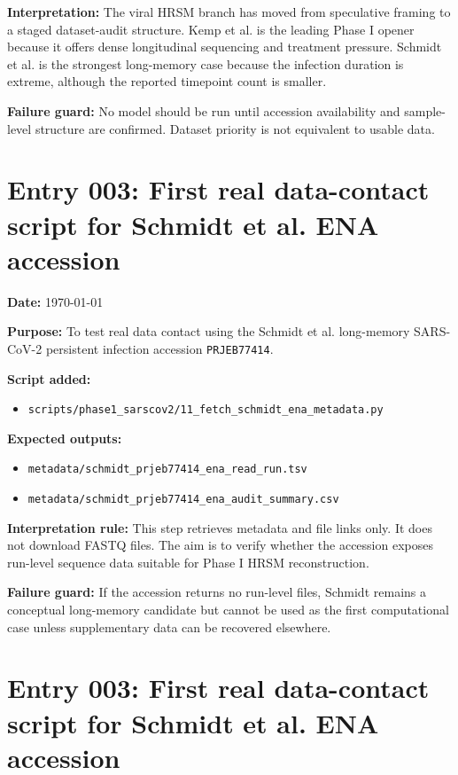 \textbf{Interpretation:} The viral HRSM branch has moved from speculative framing to a staged dataset-audit structure. Kemp et al. is the leading Phase I opener because it offers dense longitudinal sequencing and treatment pressure. Schmidt et al. is the strongest long-memory case because the infection duration is extreme, although the reported timepoint count is smaller.

\textbf{Failure guard:} No model should be run until accession availability and sample-level structure are confirmed. Dataset priority is not equivalent to usable data.


\section*{Entry 003: First real data-contact script for Schmidt et al. ENA accession}

\textbf{Date:} \today

\textbf{Purpose:} To test real data contact using the Schmidt et al. long-memory SARS-CoV-2 persistent infection accession \texttt{PRJEB77414}.

\textbf{Script added:}
\begin{itemize}
    \item \texttt{scripts/phase1\_sarscov2/11\_fetch\_schmidt\_ena\_metadata.py}
\end{itemize}

\textbf{Expected outputs:}
\begin{itemize}
    \item \texttt{metadata/schmidt\_prjeb77414\_ena\_read\_run.tsv}
    \item \texttt{metadata/schmidt\_prjeb77414\_ena\_audit\_summary.csv}
\end{itemize}

\textbf{Interpretation rule:} This step retrieves metadata and file links only. It does not download FASTQ files. The aim is to verify whether the accession exposes run-level sequence data suitable for Phase I HRSM reconstruction.

\textbf{Failure guard:} If the accession returns no run-level files, Schmidt remains a conceptual long-memory candidate but cannot be used as the first computational case unless supplementary data can be recovered elsewhere.


\section*{Entry 003: First real data-contact script for Schmidt et al. ENA accession}


